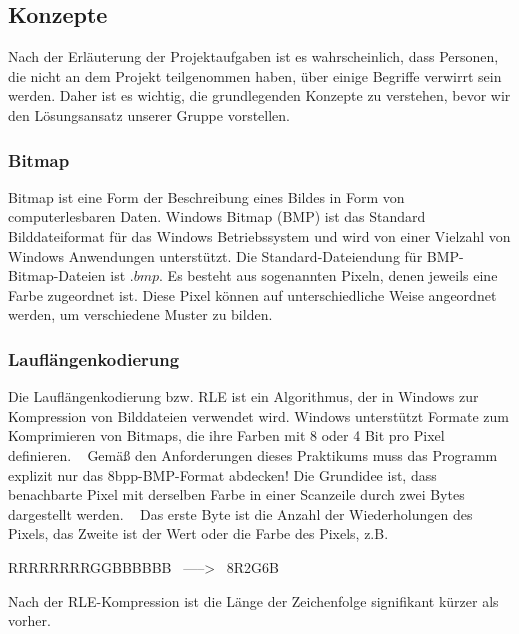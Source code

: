 \documentclass[course=erap]{aspdoc}
\begin{document}
    \subsection{Konzepte}\label{subsec:konzepte}
    Nach der Erläuterung der Projektaufgaben ist es wahrscheinlich, dass Personen, die nicht an dem Projekt
    teilgenommen haben, über einige Begriffe verwirrt sein werden.
    Daher ist es wichtig, die grundlegenden Konzepte zu verstehen, bevor wir den Lösungsansatz unserer Gruppe
    vorstellen.

    \subsubsection{Bitmap}\label{subsubsec:bitmap}
    Bitmap ist eine Form der Beschreibung eines Bildes in Form von computerlesbaren Daten.
    Windows Bitmap (BMP) ist das Standard Bilddateiformat für das
    Windows Betriebssystem und wird von einer Vielzahl von Windows Anwendungen unterstützt.
    Die Standard-Dateiendung für BMP-Bitmap-Dateien ist $.bmp$.
    Es besteht aus sogenannten Pixeln, denen jeweils eine Farbe zugeordnet ist.
    Diese Pixel können auf unterschiedliche Weise angeordnet werden, um verschiedene Muster zu bilden. \ \cite{imageProcessingInC}

    \subsubsection{Lauflängenkodierung}\label{subsubsec:lauflangenkodierung}
    Die Lauflängenkodierung bzw.
    RLE ist ein Algorithmus, der in Windows zur Kompression von Bilddateien verwendet wird.
    Windows unterstützt Formate zum Komprimieren von Bitmaps, die ihre Farben mit 8 oder 4 Bit pro Pixel
    definieren. \ \cite{rle}
    \newline
    \newline
    Gemäß den Anforderungen dieses Praktikums muss das Programm explizit nur das 8bpp-BMP-Format abdecken!
    \newline
    \newline
    Die Grundidee ist, dass benachbarte Pixel mit derselben Farbe in einer Scanzeile durch zwei Bytes
    dargestellt werden. \ \cite{bildkompressionSlides}
    Das erste Byte ist die Anzahl der Wiederholungen des Pixels, das Zweite ist der Wert oder die Farbe des Pixels,
    z.B\@.
    \begin{center}
        RRRRRRRRGGBBBBBB \ -----> \ 8R2G6B
    \end{center}
    \noindent Nach der RLE-Kompression ist die Länge der Zeichenfolge signifikant kürzer als vorher.
\end{document}
